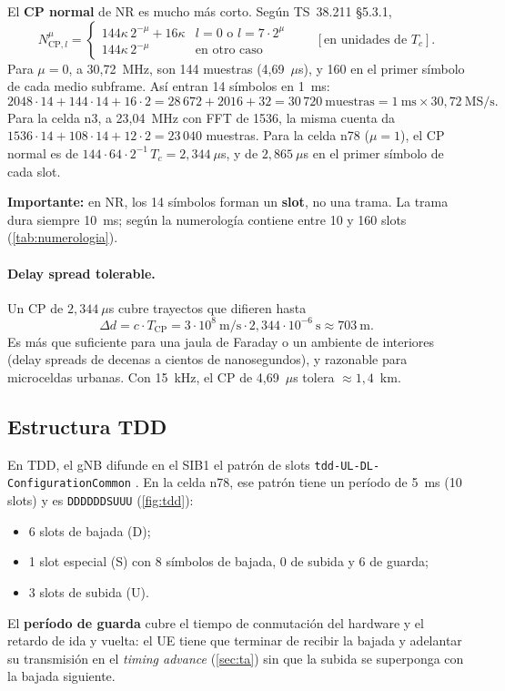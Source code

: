 El \textbf{CP normal} de NR es mucho más corto. Según TS~38.211 §5.3.1,
\begin{equation}
N_{\text{CP},l}^{\mu} =
\begin{cases}
144\kappa\, 2^{-\mu} + 16\kappa & l = 0 \text{ o } l = 7\cdot 2^{\mu}\\
144\kappa\, 2^{-\mu} & \text{en otro caso}
\end{cases}
\qquad[\text{en unidades de } T_c].
\label{eq:ncp}
\end{equation}
Para $\mu=0$, a 30,72~MHz, son 144 muestras (4,69~$\mu$s), y 160 en el primer símbolo de cada medio subframe. Así entran 14 símbolos en 1~ms:
\begin{equation}
2048\cdot 14 + 144\cdot 14 + 16\cdot 2 = 28\,672 + 2016 + 32 = 30\,720~\text{muestras} = 1~\text{ms}\times 30{,}72~\text{MS/s}.
\end{equation}
Para la celda n3, a 23,04~MHz con FFT de 1536, la misma cuenta da $1536\cdot 14 + 108\cdot 14 + 12\cdot 2 = 23\,040$ muestras. Para la celda n78 ($\mu=1$), el CP normal es de $144\cdot 64\cdot 2^{-1}\,T_c = 2{,}344~\mu$s, y de $2{,}865~\mu$s en el primer símbolo de cada slot.

\textbf{Importante:} en NR, los 14 símbolos forman un \textbf{slot}, no una trama. La trama dura siempre 10~ms; según la numerología contiene entre 10 y 160 slots (\cref{tab:numerologia}).

\paragraph{Delay spread tolerable.} Un CP de $2{,}344~\mu$s cubre trayectos que difieren hasta
\begin{equation}
\Delta d = c\cdot T_\text{CP} = 3\cdot 10^8~\text{m/s}\cdot 2{,}344\cdot 10^{-6}~\text{s} \approx 703~\text{m}.
\end{equation}
Es más que suficiente para una jaula de Faraday o un ambiente de interiores (delay spreads de decenas a cientos de nanosegundos), y razonable para microceldas urbanas. Con 15~kHz, el CP de 4,69~$\mu$s tolera $\approx 1{,}4$~km.

\subsection{Estructura TDD}\label{sec:tdd}
En TDD, el gNB difunde en el SIB1 el patrón de slots \texttt{tdd-UL-DL-ConfigurationCommon} \cite[§11.1]{ts38213}. En la celda n78, ese patrón tiene un período de 5~ms (10 slots) y es \texttt{DDDDDDSUUU} (\cref{fig:tdd}):
\begin{itemize}
  \item 6 slots de bajada (D);
  \item 1 slot especial (S) con 8 símbolos de bajada, 0 de subida y 6 de guarda;
  \item 3 slots de subida (U).
\end{itemize}
El \textbf{período de guarda} cubre el tiempo de conmutación del hardware y el retardo de ida y vuelta: el UE tiene que terminar de recibir la bajada y adelantar su transmisión en el \emph{timing advance} (\cref{sec:ta}) sin que la subida se superponga con la bajada siguiente.

